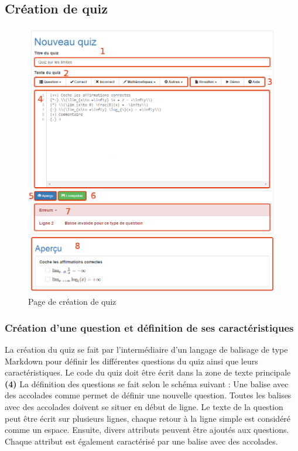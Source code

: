 \documentclass[a4,10pt,french]{sphinxmanual}
\begin{document}
\subsection{Création de quiz}
\label{doc-user:creation-de-quiz}\begin{figure}[htbp]
\centering
\capstart

\includegraphics[width=0.700\linewidth]{create.png}
\caption{Page de création de quiz}\end{figure}


\subsubsection{Création d'une question et définition de ses caractéristiques}
\label{doc-user:creation-d-une-question-et-definition-de-ses-caracteristiques}
La création du quiz se fait par l'intermédiaire d'un langage de balisage de type Markdown pour définir les différentes questions du quiz ainsi que leurs caractéristiques. Le code du quiz doit être écrit dans la zone de texte principale \textbf{(4)} La définition des questions se fait selon le schéma suivant : Une balise avec des accolades comme \code{\{++\}} permet de définir une nouvelle question. Toutes les balises avec des accolades doivent se situer en début de ligne. Le texte de la question peut être écrit sur plusieurs lignes, chaque retour à la ligne simple est considéré comme un espace. Ensuite, divers attributs peuvent être ajoutés aux questions. Chaque attribut est également caractérisé par une balise avec des accolades.
\end{document}
